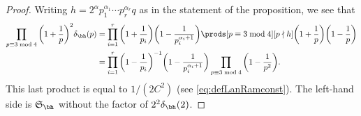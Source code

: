 \documentclass[12pt, reqno, twoside, letterpaper]{amsart}
\begin{document}
\begin{nix}
\begin{proof}
Writing $h = 2^{\alpha}p_1^{\alpha_1}\cdots p_r^{\alpha_r}q$ as in 
the statement of the proposition, we see that 
\begin{align*}
 \prod_{p \equiv 3 \bmod 4}
  \bigg(1 + \frac{1}{p}\bigg)^2
   \delta_{\bh}(p)
 & = 
  \prod_{i = 1}^{r}
   \bigg(1 + \frac{1}{p_i}\bigg)
    \bigg(1 - \frac{1}{p_i^{\alpha_i + 1}}\bigg)
     \prods[p \equiv 3 \bmod 4][p \nmid h]
      \bigg(1 + \frac{1}{p}\bigg)
       \bigg(1 - \frac{1}{p}\bigg)
 \\
 & = 
  \prod_{i = 1}^{r}
   \bigg(1 - \frac{1}{p_i}\bigg)^{-1}
    \bigg(1 - \frac{1}{p_i^{\alpha_i + 1}}\bigg)
     \prod_{p \equiv 3 \bmod 4}
      \bigg(1 - \frac{1}{p^2}\bigg).
\end{align*}
%
This last product is equal to $1/(2C^2)$ (see 
\eqref{eq:defLanRamconst}).
%
The left-hand side is $\mathfrak{S}_{\bh}$ without the factor 
of $2^2\delta_{\bh}(2)$.
\end{proof}
%
\end{nix}
\end{document}
